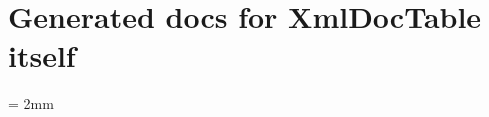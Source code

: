 \documentclass[oneside,11pt]{article}
\begin{document}
	\section{Generated docs for XmlDocTable itself}
	\tabulinesep = 2mm
	
\end{document}
